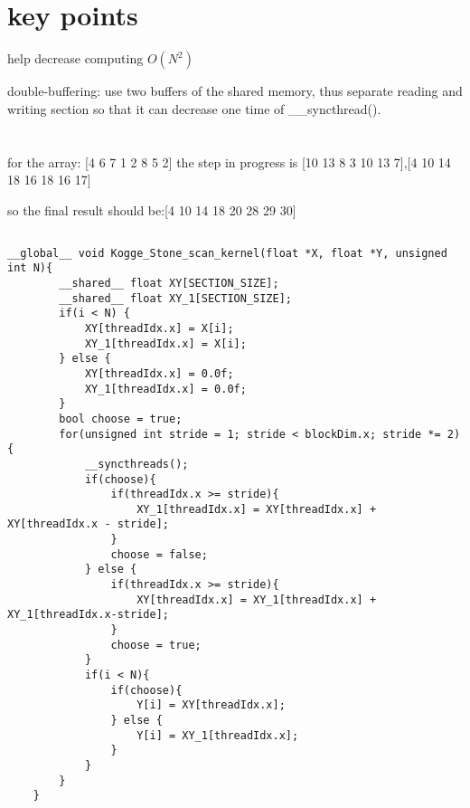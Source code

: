 \documentclass{article}
\begin{document}
\begin{lstlisting}[basicstyle=\small\ttfamily, breaklines=true]
\end{lstlisting}


\section*{key points}
help decrease computing $O(N^{2})$

double-buffering: use two buffers of the shared memory, thus separate reading and writing section so that it can decrease one time of \_\_syncthread().

\section{}
\subsection{}
for the array: [4 6 7 1 2 8 5 2]
the step in progress is [10 13 8 3 10 13 7],[4 10 14 18 16 18 16 17]

so the final result should be:[4 10 14 18 20 28 29 30]

\subsection{}
\begin{lstlisting}[basicstyle=\small\ttfamily, breaklines=true]
    __global__ void Kogge_Stone_scan_kernel(float *X, float *Y, unsigned int N){
        __shared__ float XY[SECTION_SIZE];
        __shared__ float XY_1[SECTION_SIZE];
        if(i < N) {
            XY[threadIdx.x] = X[i];
            XY_1[threadIdx.x] = X[i];
        } else {
            XY[threadIdx.x] = 0.0f;
            XY_1[threadIdx.x] = 0.0f;
        }
        bool choose = true;
        for(unsigned int stride = 1; stride < blockDim.x; stride *= 2){
            __syncthreads();
            if(choose){
                if(threadIdx.x >= stride){
                    XY_1[threadIdx.x] = XY[threadIdx.x] + XY[threadIdx.x - stride];
                }   
                choose = false;
            } else {
                if(threadIdx.x >= stride){
                    XY[threadIdx.x] = XY_1[threadIdx.x] + XY_1[threadIdx.x-stride];
                }
                choose = true;
            }
            if(i < N){
                if(choose){
                    Y[i] = XY[threadIdx.x];
                } else {
                    Y[i] = XY_1[threadIdx.x];
                }
            }
        }
    }
\end{lstlisting}
\end{document}
